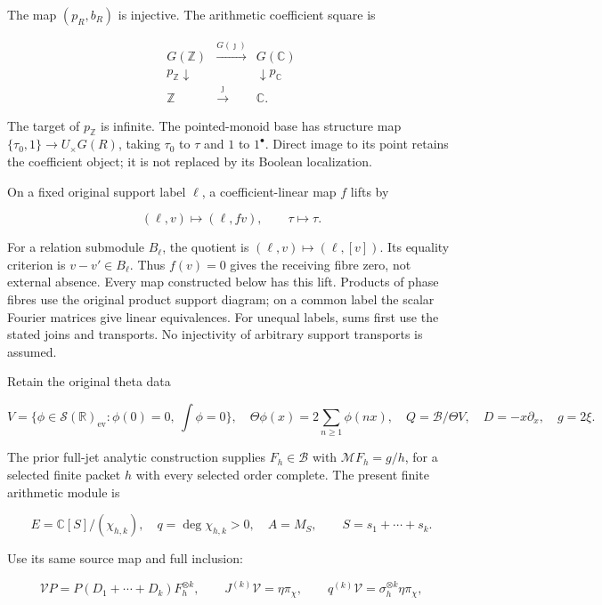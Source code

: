 \documentclass[
]{article}
\begin{document}
The map \((p_R,b_R)\) is injective. The arithmetic coefficient square is

\[
\begin{array}{ccc}
G(\mathbb Z)&\xrightarrow{G(\jmath)}&G(\mathbb C)\\
p_{\mathbb Z}\downarrow&&\downarrow p_{\mathbb C}\\
\mathbb Z&\xrightarrow{\jmath}&\mathbb C.
\end{array}
\tag{H3}
\]

The target of \(p_{\mathbb Z}\) is infinite. The pointed-monoid base has
structure map \(\{\tau_0,1\}\to U_\times G(R)\), taking \(\tau_0\) to
\(\tau\) and \(1\) to \(1^\bullet\). Direct image to its point retains
the coefficient object; it is not replaced by its Boolean localization.

On a fixed original support label \(\ell\), a coefficient-linear map
\(f\) lifts by

\[
 (\ell,v)\longmapsto(\ell,fv),\qquad \tau\longmapsto\tau.
 \tag{H4}
\]

For a relation submodule \(B_\ell\), the quotient is
\((\ell,v)\mapsto(\ell,[v])\). Its equality criterion is
\(v-v'\in B_\ell\). Thus \(f(v)=0\) gives the receiving fibre zero, not
external absence. Every map constructed below has this lift. Products of
phase fibres use the original product support diagram; on a common label
the scalar Fourier matrices give linear equivalences. For unequal
labels, sums first use the stated joins and transports. No injectivity
of arbitrary support transports is assumed.

Retain the original theta data

\[
 V=\{\phi\in\mathcal S(\mathbb R)_{\mathrm{ev}}:\phi(0)=0,\ \int\phi=0\},
 \quad\Theta\phi(x)=2\sum_{n\geq1}\phi(nx),\quad
 Q=\mathscr B/\Theta V,\quad D=-x\partial_x,\quad g=2\xi.
 \tag{H5}
\]

The prior full-jet analytic construction supplies \(F_h\in\mathscr B\)
with \(\mathcal MF_h=g/h\), for a selected finite packet \(h\) with
every selected order complete. The present finite arithmetic module is

\[
 E=\mathbb C[S]/(\chi_{h,k}),\quad q=\deg\chi_{h,k}>0,\quad A=M_S,
 \qquad S=s_1+\cdots+s_k.
 \tag{H6}
\]

Use its same source map and full inclusion:

\[
 \mathcal V P=P(D_1+\cdots+D_k)F_h^{\otimes k},\qquad
 J^{(k)}\mathcal V=\eta\pi_\chi,
 \qquad q^{(k)}\mathcal V=\sigma_h^{\otimes k}\eta\pi_\chi,
 \tag{H7}
\]
\end{document}
